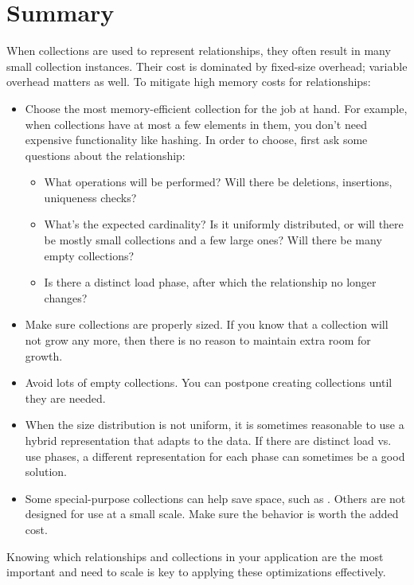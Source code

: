 
\FloatBarrier

\section{Summary}

When collections are used to represent relationships, they often result in many
small collection instances. Their cost is dominated by fixed-size
overhead; variable overhead matters as well. To mitigate high memory costs
for relationships:
\begin{itemize}
  \item Choose the most memory-efficient collection for the job at hand. For
  example, when collections have at most a few elements in them, you
  don't need expensive functionality like hashing. In
  order to choose, first ask some questions about the relationship:
  \begin{itemize}
    \item What operations will be performed? Will there be deletions,
    insertions, uniqueness checks?
    \item What's the expected cardinality? Is it uniformly
    distributed, or will there be mostly small
    collections and a few large ones? Will there be many empty collections?
    \item Is there a distinct load phase, after which the relationship no
    longer changes?
  \end{itemize}
  \item Make sure collections are properly sized. If you know that a collection
  will not grow any more, then there is no reason to maintain extra room for
  growth.
  \item Avoid lots of empty collections. You can postpone creating collections
  until they are needed.
 \item When the size distribution is not uniform, it is sometimes reasonable to
 use a hybrid representation that adapts to the data. If there are
 distinct load vs. use phases, a different representation
 for each phase can sometimes be a good solution.
 \item Some special-purpose collections can help save space, such as
 . Others are not
 designed for use at a small scale. Make sure the
 behavior is worth the added cost.
\end{itemize}
Knowing which relationships and collections in your application are the most
important and need to scale is key to applying these optimizations effectively.  




